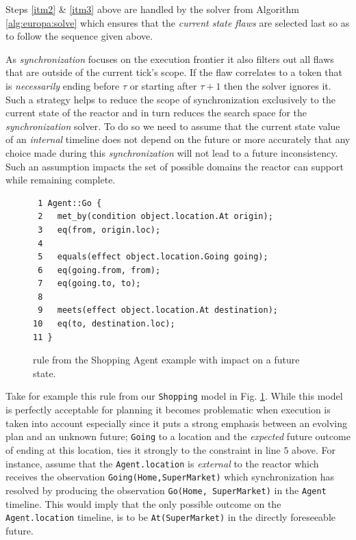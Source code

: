Steps \ref{itm2} \& \ref{itm3} above are handled by the \eu solver
from Algorithm \ref{alg:europa:solve} which ensures that the {\em
  current state flaws} are selected last so as to follow the sequence
given above.

As {\em synchronization} focuses on the execution frontier it also
filters out all flaws that are outside of the current tick's scope.
If the flaw correlates to a token that is {\em necessarily} ending
before $\tau$ or starting after $\tau+1$ then the solver ignores
it. Such a strategy helps to reduce the scope of synchronization
exclusively to the current state of the reactor and in turn reduces
the search space for the {\em synchronization} solver.  To do so we
need to assume that the current state value of an {\em internal}
timeline does not depend on the future or more accurately that any
choice made during this {\em synchronization} will not lead to a
future inconsistency.  Such an assumption impacts the set of possible
domains the reactor can support while remaining
 complete. 

\begin{figure}[h!]
\begin{verbatim}
 1 Agent::Go {
 2   met_by(condition object.location.At origin);
 3   eq(from, origin.loc);
 4
 5   equals(effect object.location.Going going);
 6   eq(going.from, from);
 7   eq(going.to, to);
 8   
 9   meets(effect object.location.At destination);
10   eq(to, destination.loc);
11 }
\end{verbatim}
\label{fig:nddl-sync}
\caption{\small \nd rule from the Shopping Agent example with impact
  on a future state.}
\end{figure}

Take for example this rule from our \texttt{Shopping} model in
Fig. \ref{fig:nddl-sync}. While this model is perfectly acceptable for
planning it becomes problematic when execution is taken into account
especially since it puts a strong emphasis between an evolving plan
and an unknown future; \texttt{Going} to a location and the {\em
  expected} future outcome of ending at this location, ties it
strongly to the constraint in line $5$ above. For instance, assume
that the \texttt{Agent.location} is {\em external} to the reactor
which receives the observation \texttt{Going(Home,SuperMarket)} which
synchronization has resolved by producing the observation
\texttt{Go(Home, SuperMarket)} in the \texttt{Agent} timeline. This
would imply that the only possible outcome on the
\texttt{Agent.location} timeline, is to be \texttt{At(SuperMarket)} in
the directly foreseeable future.

